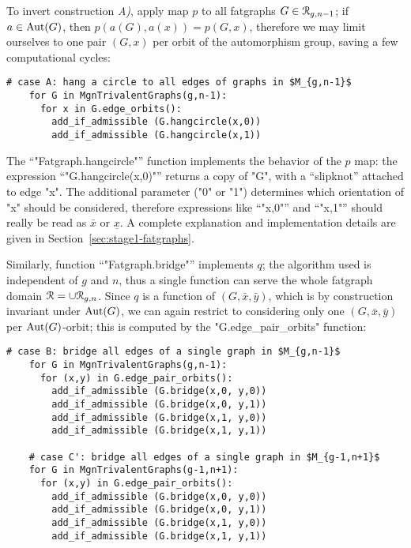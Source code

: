 To invert construction {\slshape A)}, apply map $p$ to all fatgraphs $G \in
\mathcal{R}_{g,n-1}$; if $a \in \operatorname{Aut}(G)$, then $p(a(G), a(x)) = p(G, x)$,
therefore we may limit ourselves to one pair $(G,x)$ per orbit of the
automorphism group, saving a few computational cycles:
\begin{lstlisting}[name=MgnTrivalentGraphs,firstnumber=30]
    # case A: hang a circle to all edges of graphs in $M_{g,n-1}$
    for G in MgnTrivalentGraphs(g,n-1):
      for x in G.edge_orbits():
        add_if_admissible (G.hangcircle(x,0))
        add_if_admissible (G.hangcircle(x,1))

\end{lstlisting}
The ``"Fatgraph.hangcircle"'' function implements the behavior of the
$p$ map: the expression ``"G.hangcircle(x,0)"'' returns a copy of
"G", with a ``slipknot'' attached to edge "x".  The additional
parameter ("0" or "1") determines which orientation of "x"
should be considered, therefore expressions like ``"x,0"'' and
``"x,1"'' should really be read as $\bar{x}$ or $\underline{x}$. A
complete explanation and implementation details are given in
Section~\ref{sec:stage1-fatgraphs}.

Similarly, function ``"Fatgraph.bridge"'' implements $q$;
the algorithm used is independent of $g$ and $n$, thus a single
function can serve the whole fatgraph domain $\mathcal{R} = \cup
\mathcal{R}_{g,n}$. Since $q$ is a function of $(G, \bar{x}, \bar{y})$, which
is by construction invariant under $\operatorname{Aut}(G)$, we can again restrict
to considering only one $(G, \bar{x}, \bar{y})$ per $\operatorname{Aut}(G)$-orbit;
this is computed by the "G.edge_pair_orbits" function:
\begin{lstlisting}[name=MgnTrivalentGraphs,firstnumber=35]
    # case B: bridge all edges of a single graph in $M_{g,n-1}$
    for G in MgnTrivalentGraphs(g,n-1):
      for (x,y) in G.edge_pair_orbits():
        add_if_admissible (G.bridge(x,0, y,0))
        add_if_admissible (G.bridge(x,0, y,1))
        add_if_admissible (G.bridge(x,1, y,0))
        add_if_admissible (G.bridge(x,1, y,1))

    # case C': bridge all edges of a single graph in $M_{g-1,n+1}$
    for G in MgnTrivalentGraphs(g-1,n+1):
      for (x,y) in G.edge_pair_orbits():
        add_if_admissible (G.bridge(x,0, y,0))
        add_if_admissible (G.bridge(x,0, y,1))
        add_if_admissible (G.bridge(x,1, y,0))
        add_if_admissible (G.bridge(x,1, y,1))

\end{lstlisting}

